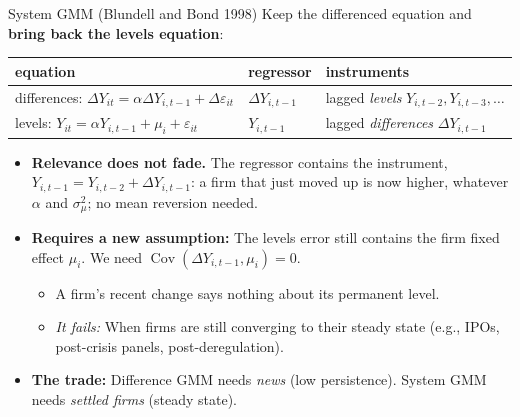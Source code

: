 \documentclass[
  11pt,
  ignorenonframetext,
  aspectratio=169,
]{beamer}
\providecommand{\tightlist}{%
  \setlength{\itemsep}{0pt}\setlength{\parskip}{0pt}}
\begin{document}
\begin{frame}{System GMM (Blundell and Bond 1998)}
\protect{}\label{system-gmm-blundell-and-bond-1998}
Keep the differenced equation and \textbf{bring back the levels
equation}:

\begin{center}\footnotesize
\begin{tabular}{lll}
\toprule
equation & regressor & instruments \\
\midrule
differences: $\Delta Y_{it} = \alpha\Delta Y_{i,t-1} + \Delta\varepsilon_{it}$ & $\Delta Y_{i,t-1}$ & lagged \emph{levels} $Y_{i,t-2}, Y_{i,t-3}, \dots$ \\
levels: $Y_{it} = \alpha Y_{i,t-1} + \mu_i + \varepsilon_{it}$ & $Y_{i,t-1}$ & lagged \emph{differences} $\Delta Y_{i,t-1}$ \\
\bottomrule
\end{tabular}
\end{center}

\begin{itemize}
\tightlist
\item
  \textbf{Relevance does not fade.} The regressor contains the
  instrument, \(Y_{i,t-1} = Y_{i,t-2} + \Delta Y_{i,t-1}\): a firm that
  just moved up is now higher, whatever \(\alpha\) and \(\sigma^2_\mu\);
  no mean reversion needed.
\item
  \textbf{Requires a new assumption:} The levels error still contains
  the firm fixed effect \(\mu_i\). We need
  \(\operatorname{Cov}(\Delta Y_{i,t-1}, \mu_i) = 0\).

  \begin{itemize}
  \tightlist
  \item
    A firm's recent change says nothing about its permanent level.
  \item
    \emph{It fails:} When firms are still converging to their steady
    state (e.g., IPOs, post-crisis panels, post-deregulation).
  \end{itemize}
\item
  \textbf{The trade:} Difference GMM needs \emph{news} (low
  persistence). System GMM needs \emph{settled firms} (steady state).
\end{itemize}
\end{frame}
\end{document}
